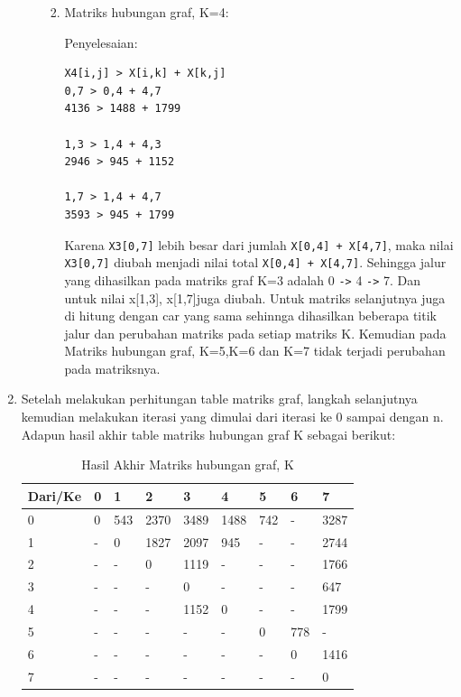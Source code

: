 \begin{enumerate}
\begin{enumerate}
\begin{enumerate}
\vspace{0.3cm}

            \item  Matriks hubungan graf, K=4:
            \par Penyelesaian:
\begin{verbatim}
X4[i,j] > X[i,k] + X[k,j]
0,7 > 0,4 + 4,7
4136 > 1488 + 1799

1,3 > 1,4 + 4,3
2946 > 945 + 1152

1,7 > 1,4 + 4,7
3593 > 945 + 1799
\end{verbatim}
            \par Karena \verb|X3[0,7]| lebih besar dari jumlah \verb|X[0,4] + X[4,7]|, maka nilai \verb|X3[0,7]| diubah menjadi nilai total \verb|X[0,4] + X[4,7]|. Sehingga jalur yang dihasilkan pada matriks graf K=3 adalah 0 \verb|->| 4 \verb|->| 7. Dan untuk nilai x[1,3], x[1,7]juga diubah. Untuk matriks selanjutnya juga di hitung dengan car yang sama sehinnga dihasilkan beberapa titik jalur dan perubahan matriks pada setiap matriks K. Kemudian pada Matriks hubungan graf, K=5,K=6 dan K=7 tidak terjadi perubahan pada matriksnya.
        \end{enumerate}
    \end{enumerate}
    
    
    
    \item Setelah melakukan perhitungan table matriks graf, langkah selanjutnya kemudian melakukan iterasi yang dimulai dari iterasi ke 0 sampai dengan n. Adapun hasil akhir table matriks hubungan graf K sebagai berikut:
    
    \vspace{1.5cm}
    
        \begin{table}[!htbp]
        \centering
        \caption{Hasil Akhir Matriks hubungan graf, K}
        \label{table35}
            \begin{tabular}{|l|l|l|l|l|l|l|l|l|}
            \hline
                Dari/Ke & 0 & 1 & 2 & 3 & 4 & 5 & 6 & 7 \\
            \hline
                0 & 0 & 543 & 2370 & 3489 & 1488 & 742 & - & 3287 \\
            \hline
                1 & - & 0 & 1827 & 2097 & 945 & - & - & 2744 \\
            \hline
                2 & - & - & 0 & 1119 & - & - & - & 1766 \\
            \hline
                3 & - & - & - & 0 & - & - & - & 647 \\
            \hline
                4 & - & - & - & 1152 & 0 & - & - & 1799 \\
            \hline
                5 & - & - & - & - & - & 0 & 778 & - \\
            \hline
                6 & - & - & - & - & - & - & 0 & 1416 \\
            \hline
                7 & - & - & - & - & - & - & - & 0 \\
            \hline
        \end{tabular}
        \end{table}
        

\end{enumerate}
